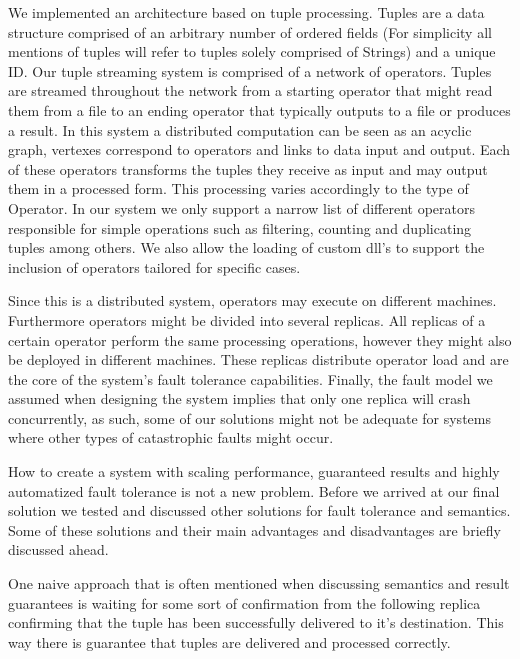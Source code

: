 \documentclass[times, 10pt,twocolumn]{article}
\begin{document}
	We implemented an architecture based on tuple processing. Tuples 
are a data structure comprised of an arbitrary number of ordered fields 
(For simplicity all mentions of tuples will refer to tuples solely comprised
 of Strings) and a unique ID. Our tuple streaming system is comprised of a 
 network of operators. Tuples are streamed throughout the 
network from a starting operator that might read them from
a file to an ending operator that typically outputs to a file or 
produces a result. In this system a distributed computation 
can be seen as an acyclic graph, vertexes correspond to operators 
and links to data input and output. Each of these operators transforms 
the tuples they receive as input and may output them in a processed 
form. This processing varies accordingly to the type of Operator.
In our system we only support a narrow list of different operators
responsible for simple operations such as filtering, counting and
duplicating tuples among others. We also allow the loading of custom 
dll's to support the inclusion of operators tailored for specific cases.

	Since this is a distributed system, operators may execute on 
different machines. Furthermore operators might be divided into
several replicas. All replicas of a certain operator perform the same 
processing operations, however they might also be deployed in different 
machines. These replicas distribute operator load and are the 
core of the system's fault tolerance capabilities. 
	Finally, the fault model we assumed when designing the system implies
that only one replica will crash concurrently, as such, some of our 
solutions might not be adequate for systems where other types of
catastrophic faults might occur.


	How to create a system with scaling performance, guaranteed results 
and highly automatized fault tolerance is not a new problem. Before we
arrived at our final solution we tested and discussed other solutions
for fault tolerance and semantics. Some of these solutions and their main 
advantages and disadvantages are briefly discussed ahead.


	One naive approach that is often mentioned when discussing semantics and 
result guarantees is waiting for some sort of confirmation from the 
following replica confirming that the tuple has been successfully delivered
to it's destination. This way there is guarantee that tuples are delivered 
and processed correctly. 
\end{document}
